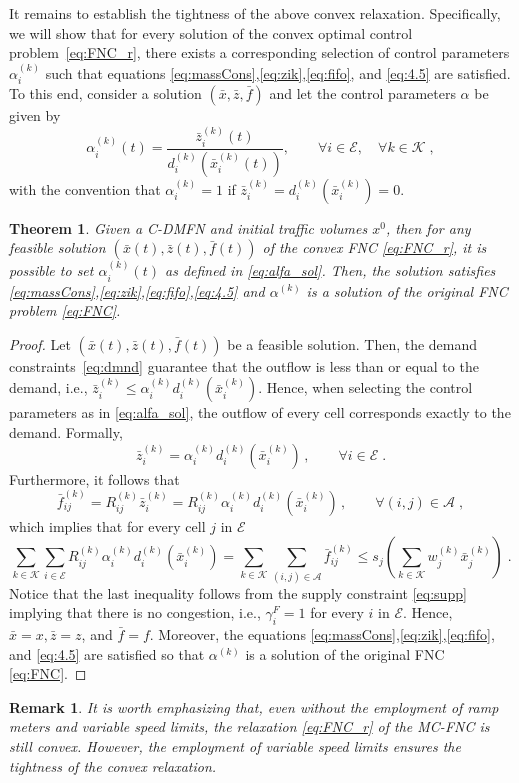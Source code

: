 \documentclass[preprint,12pt]{elsarticle}
\newtheorem{remark}{Remark}
\newtheorem{theorem}{Theorem}
\newcommand{\be}{\begin{equation}}
\newcommand{\ee}{\end{equation}}
\newcommand{\ben}{\begin{equation*}}
\newcommand{\een}{\end{equation*}}
\newcommand{\mc}{\mathcal}
\begin{document}
It remains to establish the tightness of the above convex relaxation. Specifically, we will show that for every solution of the convex optimal control problem~\eqref{eq:FNC_r}, there exists a corresponding selection of control parameters $\alpha_i^{(k)}$ such that equations \eqref{eq:massCons},\eqref{eq:zik},\eqref{eq:fifo}, and \eqref{eq:4.5} are satisfied. To this end, consider a solution $(\bar x,\bar z,\bar f)$  and let the control parameters $\alpha$ be given by
\be\label{eq:alfa_sol}
\alpha_i^{(k)}(t) = \frac{\bar z_i^{(k)}(t)}{d_i^{(k)}(\bar x_i^{(k)}(t))}, \qquad \forall i \in \mc{E}, \quad \forall k \in \mc{K}\;,
\ee
with the convention that $\alpha_i^{(k)} = 1$ if $\bar z_i^{(k)} = d_i^{(k)}(\bar x_i^{(k)}) = 0$. 
\begin{theorem}
	Given a C-DMFN and initial traffic volumes $x^0$, then for any feasible solution $(\bar x(t),\bar z(t),\bar f(t))$ of the convex FNC \eqref{eq:FNC_r}, it is possible to set $\alpha_i^{(k)}(t)$ as defined in \eqref{eq:alfa_sol}. Then, the solution satisfies \eqref{eq:massCons},\eqref{eq:zik},\eqref{eq:fifo},\eqref{eq:4.5} and $\alpha^{(k)}$ is a solution of the original FNC problem \eqref{eq:FNC}.
\end{theorem}
\begin{proof}
	Let $(\bar x(t),\bar z(t),\bar f(t))$ be a feasible solution. Then, the demand constraints~\eqref{eq:dmnd} guarantee that the outflow is less than or equal to the demand, i.e.,  $\bar z_i^{(k)} \leq \alpha_i^{(k)}d_i^{(k)}(\bar x_i^{(k)})$. Hence, when selecting the control parameters as in \eqref{eq:alfa_sol}, the outflow of every cell corresponds exactly to the demand. Formally,
	\ben
	\bar z_i^{(k)} = \alpha_i^{(k)}d_i^{(k)}(\bar x_i^{(k)})\,, \qquad \forall i \in \mc{E}\; .
	\een
	Furthermore, it follows that
	\ben
	\bar f_{ij}^{(k)} = R_{ij}^{(k)}\bar z_i^{(k)} = R_{ij}^{(k)}\alpha_i^{(k)}d_i^{(k)}(\bar x_i^{(k)})\,,\qquad \forall (i,j) \in \mc{A}\;,
	\een
	which implies that for every cell $j$ in $\mc{E}$
	\ben
	\sum\limits_{k \in \mc{K}}{\sum\limits_{i \in \mc{E}}{R_{ij}^{(k)}\alpha_i^{(k)}d_i^{(k)}(\bar x_i^{(k)})}} = \sum\limits_{k \in \mc{K}}{\sum\limits_{(i,j)\in\mc{A}}{\bar f_{ij}^{(k)}}} \leq s_{j}\left( \sum\limits_{k \in \mc{K}}{w_j^{(k)}\bar x_j^{(k)}}\right) \; .
	\een
	Notice that the last inequality follows from the supply constraint \eqref{eq:supp} implying that there is no congestion, i.e., $\gamma_i^{F} = 1$ for every $i$ in $\mc{E}$. Hence, $\bar x = x, \bar z = z$, and $\bar f = f$. Moreover, the equations \eqref{eq:massCons},\eqref{eq:zik},\eqref{eq:fifo}, and \eqref{eq:4.5} are satisfied so that $\alpha^{(k)}$ is a  solution of the original FNC \eqref{eq:FNC}.
\end{proof}
\begin{remark}
	It is worth emphasizing that, even without the employment of ramp meters and variable speed limits, the relaxation \eqref{eq:FNC_r} of the MC-FNC is still convex. However, the employment of variable speed limits ensures the tightness of the convex relaxation.
\end{remark}
\end{document}
